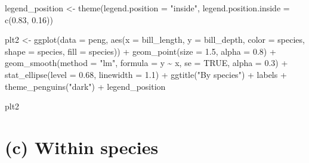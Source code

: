 \documentclass[
  letterpaper,
  10pt,
  krantz2]{krantz}
\makeatletter
\newenvironment{Shaded}{\begin{snugshade}}{\end{snugshade}}
\newcommand{\AttributeTok}[1]{\textcolor[rgb]{0.40,0.45,0.13}{#1}}
\newcommand{\ConstantTok}[1]{\textcolor[rgb]{0.56,0.35,0.01}{#1}}
\newcommand{\FloatTok}[1]{\textcolor[rgb]{0.68,0.00,0.00}{#1}}
\newcommand{\FunctionTok}[1]{\textcolor[rgb]{0.28,0.35,0.67}{#1}}
\newcommand{\NormalTok}[1]{\textcolor[rgb]{0.00,0.23,0.31}{#1}}
\newcommand{\OtherTok}[1]{\textcolor[rgb]{0.00,0.23,0.31}{#1}}
\newcommand{\SpecialCharTok}[1]{\textcolor[rgb]{0.37,0.37,0.37}{#1}}
\newcommand{\StringTok}[1]{\textcolor[rgb]{0.13,0.47,0.30}{#1}}
\newenvironment{kframe}{%
  \medskip{}
  \setlength{\fboxsep}{.8em}
  \def\at@end@of@kframe{}%
  \ifinner\ifhmode%
  \def\at@end@of@kframe{\end{minipage}}%
  \begin{minipage}{\columnwidth}%
  \fi\fi%
  \def\FrameCommand##1{\hskip\@totalleftmargin \hskip-\fboxsep
  \colorbox{shadecolor}{##1}\hskip-\fboxsep
      \hskip-\linewidth \hskip-\@totalleftmargin \hskip\columnwidth}%
  \MakeFramed {\advance\hsize-\width
    \@totalleftmargin\z@ \linewidth\hsize
    \@setminipage}}%
{\par\unskip\endMakeFramed%
  \at@end@of@kframe}
\renewenvironment{Shaded}{\begin{kframe}}{\end{kframe}}
\makeatother
\begin{document}
\begin{Shaded}
\begin{Highlighting}[]
\NormalTok{legend\_position }\OtherTok{\textless{}{-}}
  \FunctionTok{theme}\NormalTok{(}\AttributeTok{legend.position =} \StringTok{"inside"}\NormalTok{,}
        \AttributeTok{legend.position.inside =} \FunctionTok{c}\NormalTok{(}\FloatTok{0.83}\NormalTok{, }\FloatTok{0.16}\NormalTok{))}

\NormalTok{plt2 }\OtherTok{\textless{}{-}} \FunctionTok{ggplot}\NormalTok{(}\AttributeTok{data =}\NormalTok{ peng,}
               \FunctionTok{aes}\NormalTok{(}\AttributeTok{x =}\NormalTok{ bill\_length,}
                   \AttributeTok{y =}\NormalTok{ bill\_depth,}
                   \AttributeTok{color =}\NormalTok{ species,}
                   \AttributeTok{shape =}\NormalTok{ species,}
                   \AttributeTok{fill =}\NormalTok{ species)) }\SpecialCharTok{+}
  \FunctionTok{geom\_point}\NormalTok{(}\AttributeTok{size =} \FloatTok{1.5}\NormalTok{,}
             \AttributeTok{alpha =} \FloatTok{0.8}\NormalTok{) }\SpecialCharTok{+}
  \FunctionTok{geom\_smooth}\NormalTok{(}\AttributeTok{method =} \StringTok{"lm"}\NormalTok{, }\AttributeTok{formula =}\NormalTok{ y }\SpecialCharTok{\textasciitilde{}}\NormalTok{ x, }
              \AttributeTok{se =} \ConstantTok{TRUE}\NormalTok{, }\AttributeTok{alpha =} \FloatTok{0.3}\NormalTok{) }\SpecialCharTok{+}
  \FunctionTok{stat\_ellipse}\NormalTok{(}\AttributeTok{level =} \FloatTok{0.68}\NormalTok{, }\AttributeTok{linewidth =} \FloatTok{1.1}\NormalTok{) }\SpecialCharTok{+}
  \FunctionTok{ggtitle}\NormalTok{(}\StringTok{"By species"}\NormalTok{) }\SpecialCharTok{+}
\NormalTok{  labels }\SpecialCharTok{+}
  \FunctionTok{theme\_penguins}\NormalTok{(}\StringTok{"dark"}\NormalTok{) }\SpecialCharTok{+}
\NormalTok{  legend\_position }

\NormalTok{plt2}
\end{Highlighting}
\end{Shaded}

\section{(c) Within species}
\end{document}
